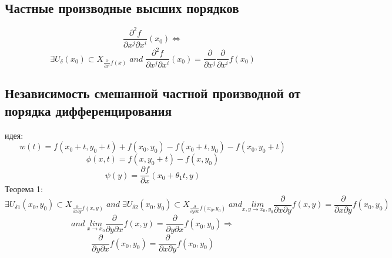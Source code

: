 \documentclass{article}
\begin{document}
\subsection{Частные производные высших порядков}
\begin{equation*}
    \frac{\partial^2 f}{\partial x^j \partial x^i}(x_0) \Leftrightarrow
\end{equation*}
\begin{equation*}
    \exists U_\delta (x_0) \subset X_{\frac{\partial}{\partial x^i} f(x)} \; and \; \frac{\partial^2 f}{\partial x^j \partial x^i}(x_0) = \frac{\partial}{\partial x^j} \frac{\partial}{\partial x^i} f(x_0)
\end{equation*}
\subsection{Независимость смешанной частной производной от порядка дифференцирования}
идея:  \\
\begin{equation*}
    w(t) = f(x_0+t, y_0+t) + f(x_0, y_0) - f(x_0+t, y_0) - f(x_0, y_0+t)
\end{equation*}
\begin{equation*}
    \phi (x, t) = f(x, y_0 + t) - f(x, y_0)
\end{equation*}
\begin{equation*}
    \psi(y) = \frac{\partial f}{\partial x} (x_0+\theta_1t, y)
\end{equation*}
Теорема 1:
\begin{equation*}
    \exists U_{\delta 1} (x_0, y_0) \subset X_{\frac{\partial}{\partial x \partial y} f(x,y)} \; and \; \exists U_{\delta 2} (x_0, y_0) \subset X_{\frac{\partial}{\partial y \partial x} f(x_0, y_0)} \; and \underset{x,y \rightarrow x_0,y_0}{lim} \frac{\partial}{\partial x \partial y} f(x,y) = \frac{\partial}{\partial x \partial y} f(x_0, y_0) \;
\end{equation*}
\begin{equation*}
    and \; \underset{x \rightarrow x_0}{lim} \frac{\partial}{\partial y \partial x} f(x, y) = \frac{\partial}{\partial y \partial x} f(x_0, y_0) \Rightarrow
\end{equation*}
\begin{equation*}
    \frac{\partial}{\partial y \partial x} f(x_0, y_0) = \frac{\partial}{\partial x \partial y} f(x_0, y_0)
\end{equation*}
\end{document}
